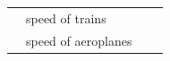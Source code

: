{\begin{tabular}[t]{|l|l|l|l|}
    
     \tabularnewline\cline{1-1}\cline{2-2}\cline{3-3}\cline{4-4}
    
    
         &
    
    
        speed of trains &
    
    
         &
    
    
     \tabularnewline\cline{1-1}\cline{2-2}\cline{3-3}\cline{4-4}
    
    
         &
    
    
        speed of aeroplanes &
    
    
         &
    

\end{tabular}}
